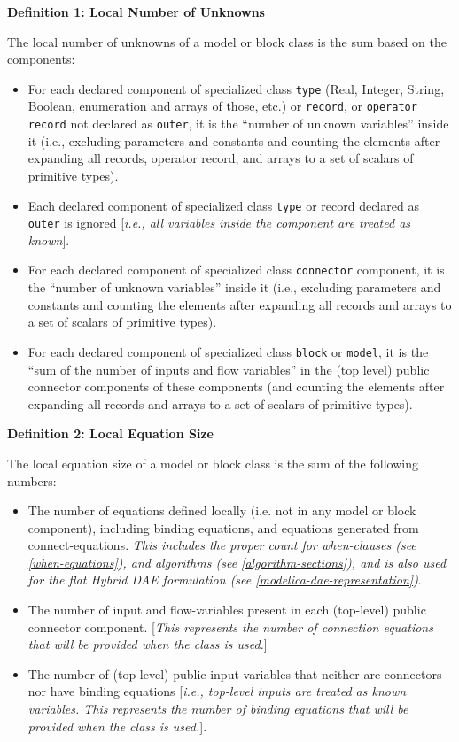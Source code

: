 \textbf{Definition 1: Local Number of Unknowns}

The local number of unknowns of a model or block class is the sum based
on the components:

\begin{itemize}
\item
  For each declared component of specialized class \lstinline!type! (Real, Integer,
  String, Boolean, enumeration and arrays of those, etc.) or \lstinline!record!, or
  \lstinline!operator record! not declared as \lstinline!outer!, it is the ``number of unknown
  variables'' inside it (i.e., excluding parameters and constants and
  counting the elements after expanding all records, operator record,
  and arrays to a set of scalars of primitive types).
\item
  Each declared component of specialized class \lstinline!type! or record declared
  as \lstinline!outer! is ignored {[}\emph{i.e., all variables inside the component
  are treated as known}{]}.
\item
  For each declared component of specialized class \lstinline!connector! component,
  it is the ``number of unknown variables'' inside it (i.e., excluding
  parameters and constants and counting the elements after expanding all
  records and arrays to a set of scalars of primitive types).
\item
  For each declared component of specialized class \lstinline!block! or \lstinline!model!, it is
  the ``sum of the number of inputs and flow variables'' in the (top
  level) public connector components of these components (and counting
  the elements after expanding all records and arrays to a set of
  scalars of primitive types).
\end{itemize}

\textbf{Definition 2: Local Equation Size}

The local equation size of a model or block class is the sum of the
following numbers:

\begin{itemize}
\item
  The number of equations defined locally (i.e. not in any model or
  block component), including binding equations, and equations generated
  from connect-equations. \emph{This includes the proper count for
  when-clauses (see \autoref{when-equations}), and algorithms (see \autoref{algorithm-sections}), 
  and is also used for the flat Hybrid DAE formulation
  (see \autoref{modelica-dae-representation})}.
\item
  The number of input and flow-variables present in each (top-level)
  public connector component. {[}\emph{This represents the number of
  connection equations that will be provided when the class is used.}{]}
\item
  The number of (top level) public input variables that neither are
  connectors nor have binding equations {[}\emph{i.e., top-level inputs
  are treated as known variables. This represents the number of binding
  equations that will be provided when the class is used.}{]}.
\end{itemize}

